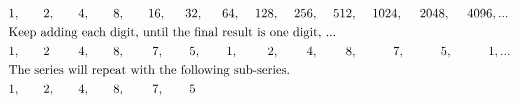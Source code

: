 \begin{alignat*}{15}
&1,&&\quad2,&&\quad4,&&\quad8,&&~~~16,&&~~32,&&~~64,&&~128,&&~256,&&~512,&&~1024,&&~2048,&&~4096, ...\\
\rlap{\text{Keep adding each digit, until the final result is one digit, ...}}\\
&1,&&\quad2&&\quad4,&&\quad8,&&\quad~7,&&\quad5,&&\quad1,&&\quad~2,&&\quad~4,&&\quad~8,&&\quad~~~7,&&\quad~~~5,&&\quad~~~1, ...\\
\rlap{\text{The series will repeat with the following sub-series.}}\\
&1,&&\quad2,&&\quad4,&&\quad8,&&\quad~7,&&\quad5
\end{alignat*}

